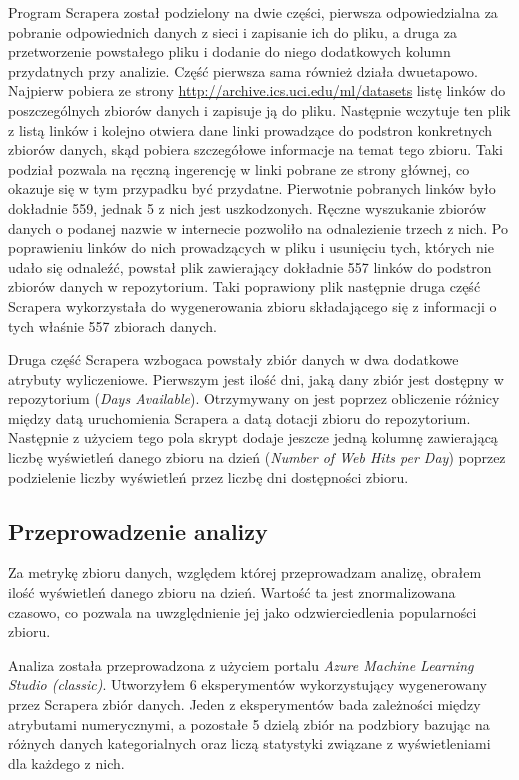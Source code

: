 Program Scrapera został podzielony na dwie części, pierwsza odpowiedzialna za pobranie odpowiednich danych z sieci i zapisanie ich do pliku, a druga za przetworzenie powstałego pliku i dodanie do niego dodatkowych kolumn przydatnych przy analizie.
Część pierwsza sama również działa dwuetapowo.
Najpierw pobiera ze strony \url{http://archive.ics.uci.edu/ml/datasets} listę linków do poszczególnych zbiorów danych i zapisuje ją do pliku.
Następnie wczytuje ten plik z listą linków i kolejno otwiera dane linki prowadzące do podstron konkretnych zbiorów danych, skąd pobiera szczegółowe informacje na temat tego zbioru.
Taki podział pozwala na ręczną ingerencję w linki pobrane ze strony głównej, co okazuje się w tym przypadku być przydatne.
Pierwotnie pobranych linków było dokładnie 559, jednak 5 z nich jest uszkodzonych.
Ręczne wyszukanie zbiorów danych o podanej nazwie w internecie pozwoliło na odnalezienie trzech z nich.
Po poprawieniu linków do nich prowadzących w pliku i usunięciu tych, których nie udało się odnaleźć, powstał plik zawierający dokładnie 557 linków do podstron zbiorów danych w repozytorium.
Taki poprawiony plik następnie druga część Scrapera wykorzystała do wygenerowania zbioru składającego się z informacji o tych właśnie 557 zbiorach danych.

Druga część Scrapera wzbogaca powstały zbiór danych w dwa dodatkowe atrybuty wyliczeniowe.
Pierwszym jest ilość dni, jaką dany zbiór jest dostępny w repozytorium (\emph{Days Available}).
Otrzymywany on jest poprzez obliczenie różnicy między datą uruchomienia Scrapera a datą dotacji zbioru do repozytorium.
Następnie z użyciem tego pola skrypt dodaje jeszcze jedną kolumnę zawierającą liczbę wyświetleń danego zbioru na dzień (\emph{Number of Web Hits per Day}) poprzez podzielenie liczby wyświetleń przez liczbę dni dostępności zbioru.

\subsection{Przeprowadzenie analizy}

Za metrykę zbioru danych, względem której przeprowadzam analizę, obrałem ilość wyświetleń danego zbioru na dzień.
Wartość ta jest znormalizowana czasowo, co pozwala na uwzględnienie jej jako odzwierciedlenia popularności zbioru.

Analiza została przeprowadzona z użyciem portalu \emph{Azure Machine Learning Studio (classic)}.
Utworzyłem 6 eksperymentów wykorzystujący wygenerowany przez Scrapera zbiór danych.
Jeden z eksperymentów bada zależności między atrybutami numerycznymi, a pozostałe 5 dzielą zbiór na podzbiory bazując na różnych danych kategorialnych oraz liczą statystyki związane z wyświetleniami dla każdego z nich.

